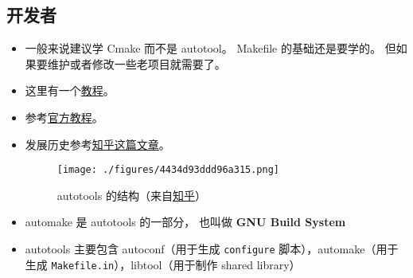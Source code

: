 \subsection{开发者}
\begin{itemize}
\item 一般来说建议学 Cmake 而不是 autotool。 Makefile 的基础还是要学的。 但如果要维护或者修改一些老项目就需要了。
\item 这里有一个\href{https://devmanual.gentoo.org/general-concepts/autotools/index.html}{教程}。
\item 参考\href{https://www.gnu.org/software/automake/manual/html_node/Autotools-Introduction.html}{官方教程}。
\item 发展历史参考\href{https://www.zhihu.com/question/22644913/answer/141475420}{知乎这篇文章}。
\begin{figure}[ht]
\centering
\texttt{[image: ./figures/4434d93ddd96a315.png]}
\caption{autotools 的结构（来自\href{https://www.zhihu.com/question/22644913/answer/141475420}{知乎}）} \label{fig_automk_1}
\end{figure}
\item automake 是 autotools 的一部分， 也叫做 \textbf{GNU Build System}
\item autotools 主要包含 autoconf（用于生成 \verb|configure| 脚本），automake（用于生成 \verb|Makefile.in|），libtool（用于制作 shared library）
\end{itemize}

